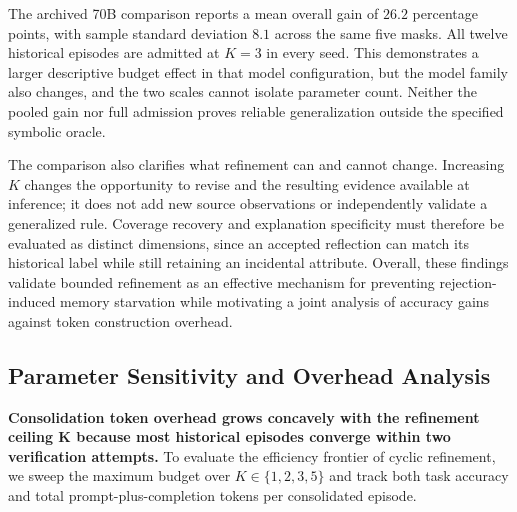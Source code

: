 \documentclass[journal]{IEEEtran}
\theoremstyle{definition}
\theoremstyle{remark}
\begin{document}
The archived 70B comparison reports a mean overall gain of $26.2$ percentage points, with sample standard deviation $8.1$ across the same five masks. All twelve historical episodes are admitted at $K=3$ in every seed. This demonstrates a larger descriptive budget effect in that model configuration, but the model family also changes, and the two scales cannot isolate parameter count. Neither the pooled gain nor full admission proves reliable generalization outside the specified symbolic oracle.

The comparison also clarifies what refinement can and cannot change. Increasing $K$ changes the opportunity to revise and the resulting evidence available at inference; it does not add new source observations or independently validate a generalized rule. Coverage recovery and explanation specificity must therefore be evaluated as distinct dimensions, since an accepted reflection can match its historical label while still retaining an incidental attribute. Overall, these findings validate bounded refinement as an effective mechanism for preventing rejection-induced memory starvation while motivating a joint analysis of accuracy gains against token construction overhead.

\subsection{Parameter Sensitivity and Overhead Analysis}
\label{sec:exp4}

\textbf{Consolidation token overhead grows concavely with the refinement ceiling $\boldsymbol{K}$ because most historical episodes converge within two verification attempts.} To evaluate the efficiency frontier of cyclic refinement, we sweep the maximum budget over $K\in\{1,2,3,5\}$ and track both task accuracy and total prompt-plus-completion tokens per consolidated episode.
\end{document}
